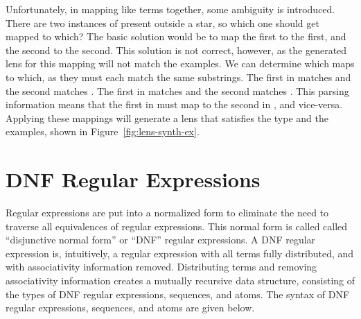 \documentclass[numbers,10pt,preprint\ifanon ,nocopyrightspace\fi]{sigplanconf}
\begin{document}
Unfortunately, in mapping like terms together, some ambiguity is introduced.
There are two
instances of  present outside a star, so which one should get mapped to
which?  The basic solution would be to map the first to the first, and the
second to the second.  This solution is not correct, however, as the generated
lens for
this mapping will not match the examples.  We can determine which maps to which, as they
must each match the same substrings.  The first  in 
matches  and the second matches .  The first 
in  matches  and the second matches .
This parsing information means that the first  in  must map to the second
 in , and vice-versa.  Applying these mappings will generate a lens
that satisfies the type and the examples, shown in Figure~\ref{fig:lens-synth-ex}.




\section{DNF Regular Expressions}

Regular expressions are put into a normalized form to eliminate the
need to traverse all equivalences of regular expressions.
This normal form is called called ``disjunctive normal form'' or
``DNF'' regular expressions.
A DNF regular expression is, intuitively, a regular expression with
all terms fully distributed, and with associativity information removed.
Distributing terms and removing associativity information creates a mutually
recursive data structure, consisting of the types of
DNF regular expressions, sequences, and atoms.
The syntax of DNF regular
expressions, sequences, and atoms are given below.\\
\end{document}
